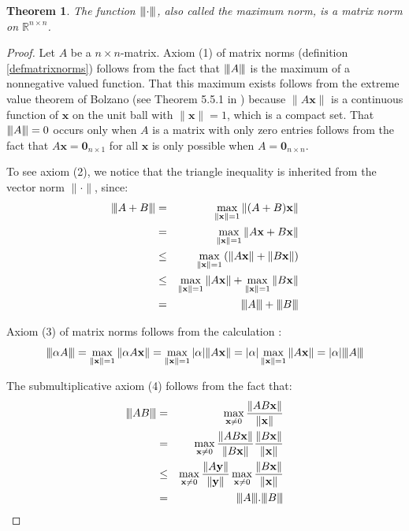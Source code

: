 \documentclass[a4paper,11pt]{report}
\newtheorem{theorem}{Theorem}[section]
\newcommand{\maxnorm}[1]{{\left\vert\kern-0.25ex\left\vert\kern-0.25ex\left\vert #1 
    \right\vert\kern-0.25ex\right\vert\kern-0.25ex\right\vert}}
\newcommand{\R}{{\mathbb R}}
\begin{document}
\begin{theorem}\label{maxnormtheo}
  The function $\maxnorm{\cdot}$, also called the maximum norm, is a matrix norm 
  on $\R^{n\times n}$.
\end{theorem}
\begin{proof}
Let $A$ be a $n \times n$-matrix.  Axiom (1) of matrix norms (definition \ref{defmatrixnorms}) follows from the fact that $\maxnorm{A}$ is 
  the maximum of a nonnegative valued function. That this maximum exists follows from the extreme value theorem of Bolzano (see Theorem 5.5.1 in \cite{caenepeel})
    because $\|A\mathbf{x}\|$ is a continuous function of $\mathbf{x}$ on the unit ball with $\|\mathbf{x}\|=1$, which is a compact 
    set. That $\maxnorm{A} = 0$ occurs only when $A$ is a matrix with only zero entries 
    follows from the fact that $A\mathbf{x} = \mathbf{0}_{n\times 1}$ for all $\mathbf{x}$ is only possible when $A = \mathbf{0}_{n\times n}$.
    
    
To see axiom (2),  we notice that the triangle inequality is inherited from the vector 
norm $\|\cdot\|$, since:
\begin{eqnarray*}
  \maxnorm{A+B} &=& \max_{\|\mathbf{x}\| = 1} \|(A+B) 
  \mathbf{x}\|\\
  &=& \max_{\|\mathbf{x}\| = 1} \|A\mathbf{x} + B\mathbf{x}\|\\
&\leq& \max_{\|\mathbf{x}\| = 1} \left(\|A\mathbf{x}\| + 
\|B\mathbf{x}\|\right)\\
&\leq& \max_{\|\mathbf{x}\| = 1} \|A\mathbf{x}\| + \max_{\|\mathbf{x}\| = 1} \|B\mathbf{x}\|
\\
&=& \maxnorm{A} + \maxnorm{B}\\
\end{eqnarray*}

Axiom (3) of matrix norms follows from the calculation :
$$\maxnorm{\alpha A} = \max_{\|\mathbf{x}\| = 1} \|\alpha A\mathbf{x}\| = \max_{\|\mathbf{x}\| = 1} |\alpha|\|A\mathbf{x}\| = |\alpha|\max_{\|\mathbf{x}\| = 1} \|A\mathbf{x}\| = |\alpha|\maxnorm{A}$$
    
The submultiplicative axiom (4) follows from the fact that:
\begin{eqnarray*}
  \maxnorm{AB} &=& \max_{\mathbf{x} \not = 0}\frac{\|AB\mathbf{x}\|}{\|\mathbf{x}\|}\\
  &=& \max_{\mathbf{x} \not = 0}\frac{\|AB\mathbf{x}\|}{\|B\mathbf{x}\|}\frac{\|B\mathbf{x}\|}{\|\mathbf{x}\|}\\
  &\leq& \max_{\mathbf{x}\not = 0}\frac{\|A\mathbf{y}\|}{\|\mathbf{y}\|}\max_{\mathbf{x}\not = 0}\frac{\|B\mathbf{x}\|}{\|\mathbf{x}\|}\\
  &=& \maxnorm{A}.\maxnorm{B}
\end{eqnarray*}   
  \end{proof}
\end{document}
